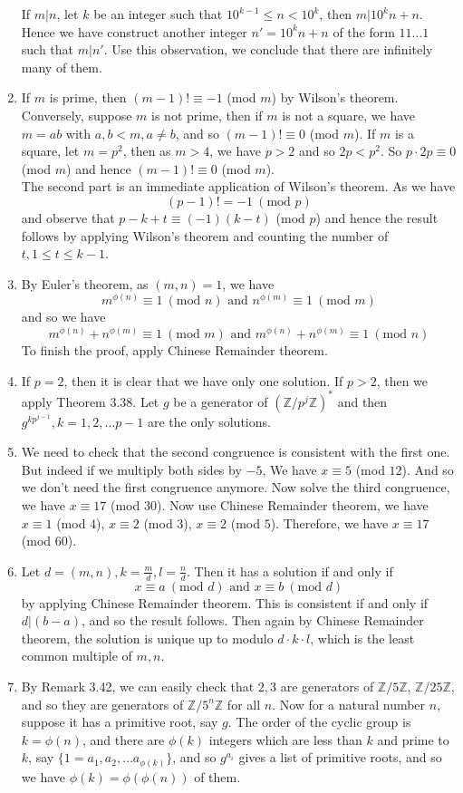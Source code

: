 \begin{enumerate}
If $m|n$, let $k$ be an integer such that $10^{k-1} \le n <10^k$, then $m|10^k n + n$. Hence we have construct another integer $n'=10^k n + n$ of the form $11\ldots 1$ such that $m|n'$. Use this observation, we conclude that there are infinitely many of them.\\
\item If $m$ is prime, then $(m-1)! \equiv -1$ (mod $m$) by Wilson's theorem. Conversely, suppose $m$ is not prime, then if $m$ is not a square, we have $m=ab$ with $a,b <m,a \neq b$, and so $(m-1)! \equiv 0$ (mod $m$). If $m$ is a square, let $m=p^2$, then as $m>4$, we have $p > 2$ and so $2p <p^2$. So $p \cdot 2p \equiv 0$ (mod $m$) and hence $(m-1)! \equiv 0$ (mod $m$).\\
    The second part is an immediate application of Wilson's theorem. As we have
    $$(p-1)!=-1~(\text{mod } p)$$ and observe that $p-k+t \equiv (-1)(k-t)$ (mod $p$) and hence the result follows by applying Wilson's theorem and counting the number of $t, 1 \le t \le k-1$.
\item By Euler's theorem, as $(m,n)=1$, we have
$$m^{\phi(n)} \equiv 1~(\text{mod } n) \text{ and } n^{\phi(m)} \equiv 1~(\text{mod } m)$$
and so we have
$$m^{\phi(n)}+n^{\phi(m)} \equiv 1~(\text{mod } m) \text{ and } m^{\phi(n)}+n^{\phi(m)} \equiv 1~(\text{mod } n)$$
To finish the proof, apply Chinese Remainder theorem.
\item If $p=2$, then it is clear that we have only one solution. If $p>2$, then we apply Theorem 3.38. Let $g$ be a generator of $(\mathbb{Z}/p^j\mathbb{Z})^*$ and then $g^{kp^{j-1}},k=1,2,\ldots p-1$ are the only solutions.
\item We need to check that the second congruence is consistent with the first one. But indeed if we multiply both sides by $-5$, We have $x \equiv 5$ (mod $12$). And so we don't need the first congruence anymore. Now solve the third congruence, we have $x \equiv 17$ (mod $30$). Now use Chinese Remainder theorem, we have $x \equiv 1$ (mod $4$), $x \equiv 2$ (mod $3$), $x \equiv 2$ (mod $5$). Therefore, we have $x \equiv 17$ (mod $60$).
\item Let $d=(m,n), k=\frac{m}{d},l=\frac{n}{d}$. Then it has a solution if and only if
$$x \equiv a~(\text{mod } d) \text{ and } x \equiv b~(\text{mod } d)$$
by applying Chinese Remainder theorem. This is consistent if and only if $d|(b-a)$, and so the result follows. Then again by Chinese Remainder theorem, the solution is unique up to modulo $d \cdot k \cdot l$, which is the least common multiple of $m,n$.
\item By Remark 3.42, we can easily check that $2,3$ are generators of $\mathbb{Z}/5\mathbb{Z}$, $\mathbb{Z}/25\mathbb{Z}$, and so they are generators of $\mathbb{Z}/5^n\mathbb{Z}$ for all $n$. Now for a natural number $n$, suppose it has a primitive root, say $g$. The order of the cyclic group is $k=\phi(n)$, and there are $\phi(k)$ integers which are less than $k$ and prime to $k$, say $\{1=a_1,a_2,\ldots a_{\phi(k)}\}$, and so $g^{a_i}$ gives a list of primitive roots, and so we have $\phi(k)=\phi(\phi(n))$ of them.

\end{enumerate}
